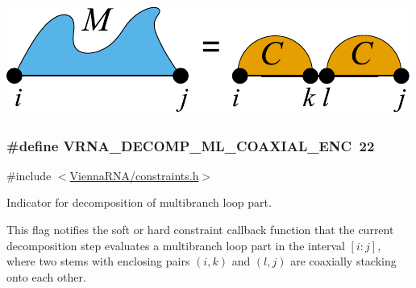  
\begin{DoxyImageNoCaption}
  \mbox{\includegraphics[width=\textwidth,height=\textheight/2,keepaspectratio=true]{decomp_ml_coaxial}}
\end{DoxyImageNoCaption}
\subsubsection[{\texorpdfstring{V\+R\+N\+A\+\_\+\+D\+E\+C\+O\+M\+P\+\_\+\+M\+L\+\_\+\+C\+O\+A\+X\+I\+A\+L\+\_\+\+E\+NC}{VRNA_DECOMP_ML_COAXIAL_ENC}}]{\setlength{\rightskip}{0pt plus 5cm}\#define V\+R\+N\+A\+\_\+\+D\+E\+C\+O\+M\+P\+\_\+\+M\+L\+\_\+\+C\+O\+A\+X\+I\+A\+L\+\_\+\+E\+NC~22}\hypertarget{group__constraints_ga0224727f7b8ad2f23eb0a3fd28d8b3fb}{}\label{group__constraints_ga0224727f7b8ad2f23eb0a3fd28d8b3fb}


{\ttfamily \#include $<$\hyperlink{constraints_8h}{Vienna\+R\+N\+A/constraints.\+h}$>$}



Indicator for decomposition of multibranch loop part. 

This flag notifies the soft or hard constraint callback function that the current decomposition step evaluates a multibranch loop part in the interval $[i:j]$, where two stems with enclosing pairs $(i,k)$ and $(l,j)$ are coaxially stacking onto each other.

